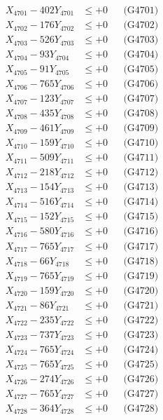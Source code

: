 \documentclass[a4paper,10pt]{article}
\begin{document}
{\begin{align}
\allowbreak
X_{4701} - 402Y_{4701} &\leq +0 && \text{(G4701)} \\
X_{4702} - 176Y_{4702} &\leq +0 && \text{(G4702)} \\
X_{4703} - 526Y_{4703} &\leq +0 && \text{(G4703)} \\
X_{4704} - 93Y_{4704} &\leq +0 && \text{(G4704)} \\
X_{4705} - 91Y_{4705} &\leq +0 && \text{(G4705)} \\
X_{4706} - 765Y_{4706} &\leq +0 && \text{(G4706)} \\
X_{4707} - 123Y_{4707} &\leq +0 && \text{(G4707)} \\
X_{4708} - 435Y_{4708} &\leq +0 && \text{(G4708)} \\
X_{4709} - 461Y_{4709} &\leq +0 && \text{(G4709)} \\
X_{4710} - 159Y_{4710} &\leq +0 && \text{(G4710)} \\
\allowbreak
X_{4711} - 509Y_{4711} &\leq +0 && \text{(G4711)} \\
X_{4712} - 218Y_{4712} &\leq +0 && \text{(G4712)} \\
X_{4713} - 154Y_{4713} &\leq +0 && \text{(G4713)} \\
X_{4714} - 516Y_{4714} &\leq +0 && \text{(G4714)} \\
X_{4715} - 152Y_{4715} &\leq +0 && \text{(G4715)} \\
X_{4716} - 580Y_{4716} &\leq +0 && \text{(G4716)} \\
X_{4717} - 765Y_{4717} &\leq +0 && \text{(G4717)} \\
X_{4718} - 66Y_{4718} &\leq +0 && \text{(G4718)} \\
X_{4719} - 765Y_{4719} &\leq +0 && \text{(G4719)} \\
X_{4720} - 159Y_{4720} &\leq +0 && \text{(G4720)} \\
\allowbreak
X_{4721} - 86Y_{4721} &\leq +0 && \text{(G4721)} \\
X_{4722} - 235Y_{4722} &\leq +0 && \text{(G4722)} \\
X_{4723} - 737Y_{4723} &\leq +0 && \text{(G4723)} \\
X_{4724} - 765Y_{4724} &\leq +0 && \text{(G4724)} \\
X_{4725} - 765Y_{4725} &\leq +0 && \text{(G4725)} \\
X_{4726} - 274Y_{4726} &\leq +0 && \text{(G4726)} \\
X_{4727} - 765Y_{4727} &\leq +0 && \text{(G4727)} \\
X_{4728} - 364Y_{4728} &\leq +0 && \text{(G4728)} \\

\end{align}}
\end{document}
